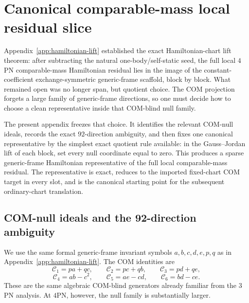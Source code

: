 \documentclass[11pt]{article}
\begin{document}

\section{Canonical comparable-mass local residual slice}
\label{app:canonical-slice}

Appendix~\ref{app:hamiltonian-lift} established the exact Hamiltonian-chart lift
theorem: after subtracting the natural one-body/self-static seed, the full local
$4$PN comparable-mass Hamiltonian residual lies in the image of the
constant-coefficient exchange-symmetric generic-frame scaffold, block by block.
What remained open was no longer span, but quotient choice.  The COM projection
forgets a large family of generic-frame directions, so one must decide how to
choose a clean representative inside that COM-blind null family.

The present appendix freezes that choice.  It identifies the relevant COM-null
ideals, records the exact $92$-direction ambiguity, and then fixes one
canonical representative by the simplest exact quotient rule available: in the
Gauss--Jordan lift of each block, set every null coordinate equal to zero.
This produces a sparse generic-frame Hamiltonian representative of the full
local comparable-mass residual.  The representative is exact, reduces to the
imported fixed-chart COM target in every slot, and is the canonical starting
point for the subsequent ordinary-chart translation.

\subsection{COM-null ideals and the 92-direction ambiguity}
\label{app:canonical-slice-null-ideals}

We use the same formal generic-frame invariant symbols
\(
a,b,c,d,e,p,q
\)
as in Appendix~\ref{app:hamiltonian-lift}.  The COM identities are
\begin{equation}
\mathcal C_1 = p a + q c,
\qquad
\mathcal C_2 = p c + q b,
\qquad
\mathcal C_3 = p d + q e,
\label{eq:app-canonical-slice-C123}
\end{equation}
\begin{equation}
\mathcal C_4 = ab-c^2,
\qquad
\mathcal C_5 = ae-cd,
\qquad
\mathcal C_6 = bd-ce.
\label{eq:app-canonical-slice-C456}
\end{equation}
These are the same algebraic COM-blind generators already familiar from the
$3$PN analysis.  At $4$PN, however, the null family is substantially larger.
\end{document}
